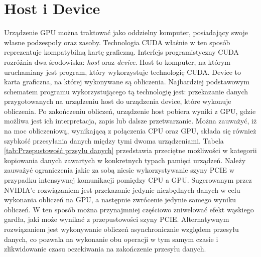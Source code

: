 \section{Host i Device}
Urządzenie GPU można traktować jako oddzielny komputer, posiadający swoje własne podzespoły oraz zasoby. Technologia CUDA właśnie w ten sposób reprezentuje kompatybilną kartę graficzną. Interfejs programistyczny CUDA rozróżnia dwa środowiska: \textit{host} oraz \textit{device}. Host to komputer, na którym uruchamiany jest program, który wykorzystuje technologię CUDA. Device to karta graficzna, na której wykonywane są obliczenia. Najbardziej podstawowym schematem programu wykorzystującego tą technologię jest: przekazanie danych przygotowanych na urządzeniu host do urządzenia device, które wykonuje obliczenia. Po zakończeniu obliczeń, urządzenie host pobiera wyniki z GPU, gdzie możliwa jest ich interpretacja, zapis lub dalsze przetwarzanie. Można zauważyć, iż na moc obliczeniową, wynikającą z połączenia CPU oraz GPU, składa się również szybkość przesyłania danych między tymi dwoma urządzeniami. Tabela \ref{tab:Przepustowość przsyłu danych} przedstawia przeciętne możliwości w kategorii kopiowania danych zawartych w konkretnych typach pamięci urządzeń. Należy zauważyć ograniczenia jakie za sobą niesie wykorzystywanie szyny PCIE w przypadku intensywnej komunikacji pomiędzy CPU a GPU. Sugerowanym przez NVIDIA'e rozwiązaniem jest przekazanie jedynie niezbędnych danych w celu wykonania obliczeń na GPU, a następnie zwrócenie jedynie samego wyniku obliczeń. W ten sposób można przynajmniej częściowo zniwelować efekt wąskiego gardła, jaki może wynikać z przepustowości szyny PCIE. Alternatywnym rozwiązaniem jest wykonywanie obliczeń asynchronicznie względem przesyłu danych, co pozwala na wykonanie obu operacji w tym samym czasie i zlikwidowanie czasu oczekiwania na zakończenie przesyłu danych.


